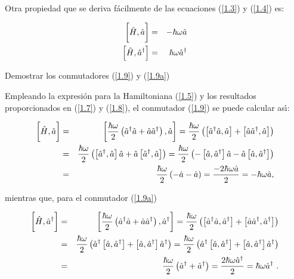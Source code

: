 \noindent
Otra propiedad que se deriva fácilmente de las ecuaciones (\ref{1.3}) y (\ref{1.4}) es:

\begin{eqnarray}
\comm\bigg{\hat{H}}{\Oaa} &=&-\hbar \omega \Oaa  \label{1.9} \\
\left[ \hat{H},\Oaa^{\dagger }\right] &=&\hbar \omega \Oaa^{\dagger}  \label{1.9a}
\end{eqnarray}

\begin{exercise}
Demostrar los conmutadores (\ref{1.9}) y (\ref{1.9a})
\end{exercise}

\newcommand{\OoH}{\hat{H}}

\begin{solution}
Empleando la expresi\'{o}n para la Hamiltoniana (\ref{1.5}) y los resultados proporcionados en (\ref{1.7}) y (\ref{1.8}), el conmutador (\ref{1.9}) se puede calcular as\'{\i}:

\begin{eqnarray*}
\comm\bigg{\OoH}{\Oaa} &=&\left[ \frac{\hbar \omega }{2}\left( \Oaa^{\dagger} \Oaa+\Oaa \Oaa^{\dagger }\right) ,\Oaa \right] =\frac{\hbar \omega }{2}\left( \left[ \Oaa^{\dagger }\Oaa,\Oaa\right] +\left[ \Oaa \Oaa^{\dagger },\Oaa\right] \right) \\
&=&\frac{\hbar \omega }{2}\left( \left[ \Oaa^{\dagger },\Oaa \right] \Oaa + \Oaa \left[ \Oaa^{\dagger }, \Oaa \right] \right) =\frac{\hbar \omega }{2}\left( -\left[ \Oaa, \Oaa^{\dagger }\right] \Oaa - \Oaa \left[ \Oaa , \Oaa^{\dagger }\right] \right) \\
&=&\frac{\hbar \omega }{2}\left( -\Oaa-\Oaa\right) =\frac{-2\hbar \omega \Oaa}{2} =-\hbar \omega \Oaa,
\end{eqnarray*}

mientras que, para el conmutador (\ref{1.9a})

\begin{eqnarray*}
\comm\bigg{\OoH}{\Oaa^\dagger} &=&\left[ \frac{\hbar \omega }{2}\left( \Oaa^{\dagger }\Oaa+\Oaa \Oaa^{\dagger }\right) ,\Oaa^{\dagger }\right] =\frac{\hbar \omega }{2}\left( \left[ \Oaa^{\dagger }\Oaa,\Oaa^{\dagger }\right] +\left[ \Oaa \Oaa^{\dagger},\Oaa^{\dagger }\right]\right) \\
&=&\frac{\hbar \omega }{2}\left( \Oaa^{\dagger }\left[ \Oaa,\Oaa^{\dagger }\right] +\left[ \Oaa,\Oaa^{\dagger }\right] \Oaa^{\dagger }\right) =\frac{\hbar \omega }{2}\left( \Oaa^{\dagger }\left[ \Oaa,\Oaa^{\dagger }\right] +\left[ \Oaa,\Oaa^{\dagger }\right] \Oaa^{\dagger }\right) \\
&=&\frac{\hbar \omega }{2}\left( \Oaa^{\dagger }+\Oaa^{\dagger }\right) =\frac{2\hbar \omega \Oaa^{\dagger }}{2}=\hbar \omega \Oaa^{\dagger }~.
\end{eqnarray*}


\end{solution}
